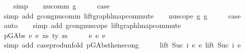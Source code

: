 \begin{isabellebody}
\ \ \isamarkupfalse%
\ simp\isanewline
{}\isamarkupfalse%
\isanewline
\ \ \isamarkupfalse%
\ {\isacharparenleft}{\kern0pt}nu{\isacharunderscore}{\kern0pt}comm\ g{\isacharparenright}{\kern0pt}\isanewline
\ \ \isamarkupfalse%
\ \isamarkupfalse%
\ {\isacharquery}{\kern0pt}case\isanewline
\ \ \isamarkupfalse%
\ {\isacharparenleft}{\kern0pt}simp\ add{\isacharcolon}{\kern0pt}\ gcong{\isachardot}{\kern0pt}nu{\isacharunderscore}{\kern0pt}comm\ lift{\isacharunderscore}{\kern0pt}graph{\isacharunderscore}{\kern0pt}lmap{\isacharunderscore}{\kern0pt}commute{\isacharparenright}{\kern0pt}\isanewline
{}\isamarkupfalse%
\isanewline
\ \ \isamarkupfalse%
\ {\isacharparenleft}{\kern0pt}nu{\isacharunderscore}{\kern0pt}scope\ g{}\ g{}{\isacharparenright}{\kern0pt}\isanewline
\ \ \isamarkupfalse%
\ \isamarkupfalse%
\ {\isacharquery}{\kern0pt}case\isanewline
\ \ \isamarkupfalse%
\ auto\isanewline
\ \ \isamarkupfalse%
\ {\isacharparenleft}{\kern0pt}simp\ add{\isacharcolon}{\kern0pt}\ gcong{\isachardot}{\kern0pt}nu{\isacharunderscore}{\kern0pt}scope\ lift{\isacharunderscore}{\kern0pt}graph{\isacharunderscore}{\kern0pt}lmap{\isacharunderscore}{\kern0pt}commute{\isacharparenright}{\kern0pt}\isanewline
{}\isamarkupfalse%
\isanewline
\ \ \isamarkupfalse%
\ {\isacharparenleft}{\kern0pt}p{\isacharunderscore}{\kern0pt}GAbs\ e\ e{\isacharprime}{\kern0pt}\ xs\ ty\ zs{\isacharparenright}{\kern0pt}\isanewline
\ \ \isamarkupfalse%
\ \isamarkupfalse%
\ {\isachardoublequoteopen}e\ {\isasymsimeq}e\ e{\isacharprime}{\kern0pt}{\isachardoublequoteclose}\isanewline
\ \ \ \ \isamarkupfalse%
\ {\isacharparenleft}{\kern0pt}simp\ add{\isacharcolon}{\kern0pt}\ case{\isacharunderscore}{\kern0pt}prod{\isacharunderscore}{\kern0pt}unfold\ p{\isacharunderscore}{\kern0pt}GAbs{\isacharunderscore}{\kern0pt}then{\isacharunderscore}{\kern0pt}econg{\isacharparenright}{\kern0pt}\isanewline
\ \ \isamarkupfalse%
\ \isamarkupfalse%
\ {\isachardoublequoteopen}lift\ {\isacharparenleft}{\kern0pt}Suc\ i{\isacharparenright}{\kern0pt}\ e\ {\isasymsimeq}e\ lift\ {\isacharparenleft}{\kern0pt}Suc\ i{\isacharparenright}{\kern0pt}\ e{\isacharprime}{\kern0pt}{\isachardoublequoteclose}\isanewline
\ \ \ \ \isamarkupfalse%

\end{isabellebody}
